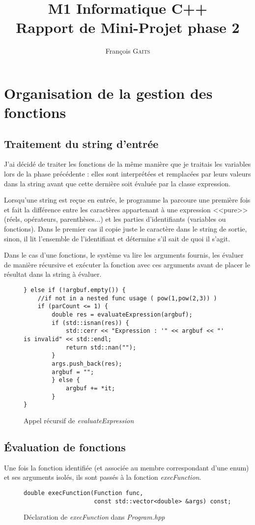 \documentclass[]{article}
\author{François G\textsc{aits}}
\title{M1 Informatique C++\\Rapport de Mini-Projet phase 2}
\begin{document}
\maketitle

\section{Organisation de la gestion des fonctions}
\subsection{Traitement du string d'entrée}
J'ai décidé de traiter les fonctions de la même manière que je traitais les variables lors de la phase précédente : elles sont interprétées et remplacées par leurs valeurs dans la string avant que cette dernière soit évaluée par la classe expression.

Lorsqu'une string est reçue en entrée, le programme la parcoure une première fois et fait la différence entre les caractères appartenant à une expression <<pure>> (réels, opérateurs, parenthèses...) et les parties d'identifiants (variables ou fonctions). Dans le premier cas il copie juste le caractère dans le string de sortie, sinon, il lit l'ensemble de l'identifiant et détermine s'il sait de quoi il s'agit.

Dans le cas d'une fonctions, le système va lire les arguments fournis, les évaluer de manière récursive et exécuter la fonction avec ces arguments avant de placer le résultat dans la string à évaluer.

\begin{figure}[h]
\centering
\begin{lstlisting}
} else if (!argbuf.empty()) {
	//if not in a nested func usage ( pow(1,pow(2,3)) )
	if (parCount <= 1) {
		double res = evaluateExpression(argbuf);
		if (std::isnan(res)) {
			std::cerr << "Expression : '" << argbuf << "' is invalid" << std::endl;
			return std::nan("");
		}
		args.push_back(res);
		argbuf = "";
		} else {
			argbuf += *it;
		}
}
\end{lstlisting}
\caption{Appel récursif de \textit{evaluateExpression}}
\end{figure} 

\subsection{Évaluation de fonctions}
Une fois la fonction identifiée (et associée au membre correspondant d'une enum) et ses arguments isolés, ils sont passés à la fonction \textit{execFunction}.
\begin{figure}[h]
\centering
\begin{lstlisting}
double execFunction(Function func, 
					const std::vector<double> &args) const;
\end{lstlisting}
\caption{Déclaration de \textit{execFunction} dans \textit{Program.hpp}}
\end{figure} 
\end{document}
